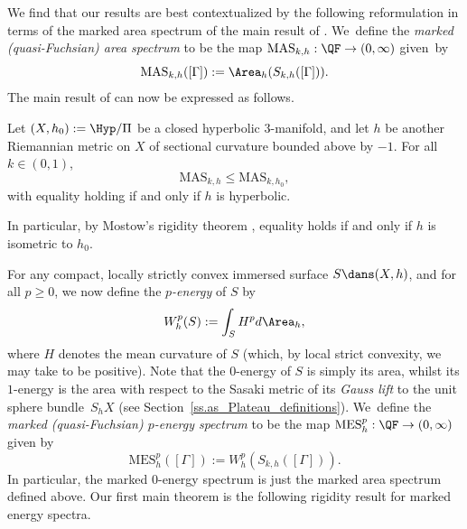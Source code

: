 We find that our results are best contextualized by the following reformulation in terms of the marked area spectrum of the main result of \cite{ALS}. We~define the \emph{marked (quasi-Fuchsian) \ksurface area spectrum} to be the map $\text{MAS}_{k,h}:\QF\to(0,\infty)$ given~by
\begin{equation*}
\text{MAS}_{k,h}([\Gamma]) := \Area_h(S_{k,h}([\Gamma])).
\end{equation*}
The main result of \cite{ALS} can now be expressed as follows.

\begin{theorem}\label{th.rigidity_area}
Let $(X,h_0):=\Hyp/\Pi$ be a closed hyperbolic $3$\nobreakdash-manifold, and let $h$ be another Riemannian metric on $X$ of sectional curvature bounded above by $-1$. For all $k\in(0,1)$,
\begin{equation}\label{eqn.rigidity_area}
\mathrm{MAS}_{k,h}\leq\mathrm{MAS}_{k,h_0},
\end{equation}
with equality holding if and only if $h$ is hyperbolic.
\end{theorem}

\begin{remark} In particular, by Mostow's rigidity theorem \cite{Mostow}, equality holds if and only if $h$ is isometric to $h_0$.
\end{remark}

For any compact, locally strictly convex immersed surface $S\dans (X,h)$, and for all $p\geq 0$, we now define the \emph{$p$-energy} of $S$ by
\begin{equation}\label{eq.energy}
W^p_h(S):=\int_SH^pd\Area_h,
\end{equation}
where $H$ denotes the mean curvature of $S$ (which, by local strict convexity, we may take to be positive). Note that the $0$-energy of $S$ is simply its area, whilst its $1$-energy is the area with respect to the Sasaki metric of its \emph{Gauss lift} to the unit sphere bundle~$S_hX$ (see Section~\ref{ss.as_Plateau_definitions}). We~define the \emph{marked (quasi-Fuchsian) \ksurface $p$-energy spectrum} to be the map $\text{MES}_h^p:\QF\to(0,\infty)$ given by
\begin{equation}\label{eq.MarkedEnergySpectrum}
\text{MES}_h^p([\Gamma]) := W^p_h(S_{k,h}([\Gamma])).
\end{equation}
In particular, the marked $0$-energy spectrum is just the marked area spectrum defined above. Our first main theorem is the following rigidity result for marked energy spectra.

